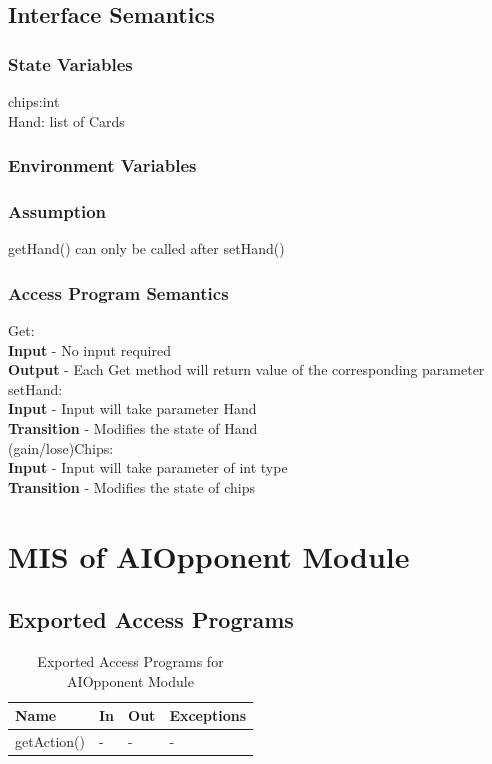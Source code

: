 \documentclass[11pt]{article}
\begin{document}
    \subsection{Interface Semantics}
    \subsubsection{State Variables}
    chips:int\\
    Hand: list of Cards
    \subsubsection{Environment Variables}
    \subsubsection{Assumption}
    getHand() can only be called after setHand()
    \subsubsection{Access Program Semantics}
    Get:\\
    \textbf{Input} - No input required\\
    \textbf{Output} - Each Get method will return value of the corresponding parameter\\
    setHand:\\
   	\textbf{Input} - Input will take parameter Hand\\
   	\textbf{Transition} - Modifies the state of Hand\\
   	(gain/lose)Chips:\\
   	\textbf{Input} - Input will take parameter of int type\\
   	\textbf{Transition} - Modifies the state of chips
 	\newline
 	\section{MIS of AIOpponent Module}
     
    \subsection{Exported Access Programs}
    \begin{table}[h]
    \caption{Exported Access Programs for AIOpponent Module}
    \begin{tabular}{p{4cm}p{2cm}p{2cm}p{4cm}}
    Name & In & Out & Exceptions\\
    \hline
    getAction() & - & - & -\\
    \hline
    \end{tabular}
    \end{table}
\end{document}
